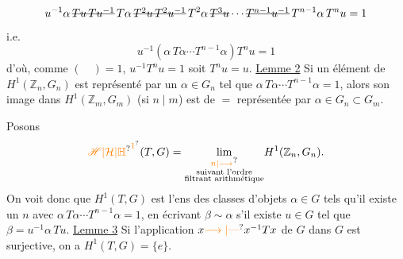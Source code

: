 \[
u^{-1}\alpha\,\deleted{Tu\,Tu^{-1}}\,T\alpha\,\deleted{T^2u\,T^2u^{-1}}\,T^2\alpha\,\deleted{T^3u}\cdots\deleted{T^{n-1}u^{-1}}\,T^{n-1}\alpha\,T^nu=1
\]
i.e.
\[
u^{-1}(\alpha\,T\alpha\cdots T^{n-1}\alpha)T^nu=1
\]
d'où, comme $(\quad)=1$, $u^{-1}T^nu=1$ soit $T^nu=u$.
\uline{Lemme 2} Si un élément de $H^1(\mathbb Z_n,G_n)$ est représenté par un $\alpha\in G_n$ tel que $\alpha\,T\alpha\cdots T^{n-1}\alpha=1$, alors son image dans $H^1(\mathbb Z_m,G_m)$ (si $n\mid m$) est de $=$ représentée par $\alpha\in G_n\subset G_m$.

Posons
\[
{\unsure{\mathscr H|\mathcal H|\mathbb H}}^{\unsure{1}}(T,G)=\underset{\substack{\unsure{n|\longrightarrow}\\\text{suivant l'ordre}\\\text{filtrant arithmétique}}}{\lim}H^1(\mathbb Z_n,G_n).
\]
On voit donc que $H^1(T,G)$ est l'ens des classes d'objets $\alpha\in G$ tels qu'il existe un $n$ avec $\alpha\,T\alpha\cdots T^{n-1}\alpha=1$,  en écrivant $\beta\sim\alpha$ s'il existe $u\in G$ tel que $\beta=u^{-1}\alpha\,Tu$.
\uline{Lemme 3} Si   l'application $x\unsure{\longrightarrow|\text{---}}x^{-1}Tx$ de $G$ dans $G$ est surjective, on a $H^1(T,G)=\{e\}$.

